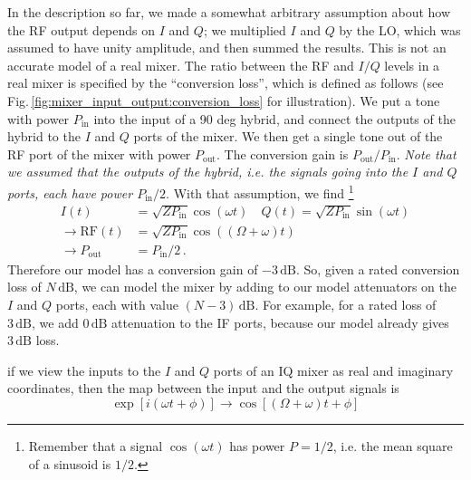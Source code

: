 

In the description so far, we made a somewhat arbitrary assumption about how the RF output depends on $I$ and $Q$; we multiplied $I$ and $Q$ by the LO, which was assumed to have unity amplitude, and then summed the results.
This is not an accurate model of a real mixer.
The ratio between the RF and $I/Q$ levels in a real mixer is specified by the ``conversion loss'', which is defined as follows (see Fig.\,\ref{fig:mixer_input_output:conversion_loss} for illustration).
We put a tone with power $P_\text{in}$ into the input of a 90 deg hybrid, and connect the outputs of the hybrid to the $I$ and $Q$ ports of the mixer.
We then get a single tone out of the RF port of the mixer with power $P_\text{out}$.
The conversion gain is $P_\text{out}/P_\text{in}$.
\emph{Note that we assumed that the outputs of the hybrid, i.e. the signals going into the $I$ and $Q$ ports, each have power $P_\text{in}/2$}.
With that assumption, we find \footnote{Remember that a signal $\cos(\omega t)$ has power $P=1/2$, i.e. the mean square of a sinusoid is $1/2$.}
\begin{align}
I(t) &= \sqrt{Z P_\text{in}} \cos(\omega t) \quad Q(t) = \sqrt{Z P_\text{in}} \sin(\omega t) \nonumber \\
\rightarrow \text{RF}(t) &= \sqrt{Z P_\text{in}} \cos((\Omega + \omega) t) \nonumber \\
\rightarrow P_\text{out} &= P_\text{in} / 2 \, . \nonumber
\end{align}
Therefore our model has a conversion gain of $-3\,\text{dB}$.
So, given a rated conversion loss of $N\,\text{dB}$, we can model the mixer by adding to our model attenuators on the $I$ and $Q$ ports, each with value $(N-3) \, \text{dB}$.
For example, for a rated loss of $3\,\text{dB}$, we add $0\, \text{dB}$ attenuation to the IF ports, because our model already gives $3\,\text{dB}$ loss.

if we view the inputs to the $I$ and $Q$ ports of an IQ mixer as real and imaginary coordinates, then the map between the input and the output signals is \begin{equation}
\exp[i(\omega t + \phi)] \rightarrow \cos[(\Omega+\omega)t + \phi] \end{equation}


